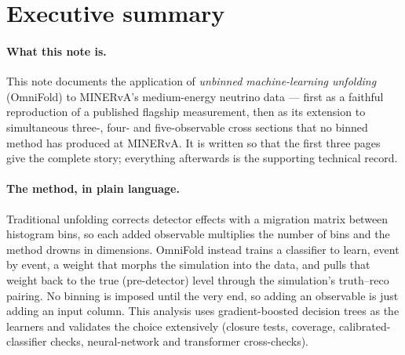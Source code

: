 \section*{Executive summary}
\label{sec:execsummary}

\paragraph{What this note is.}
This note documents the application of \emph{unbinned machine-learning
unfolding} (OmniFold) to MINERvA's medium-energy neutrino data --- first as a
faithful reproduction of a published flagship measurement, then as its
extension to simultaneous three-, four- and five-observable cross sections
that no binned method has produced at MINERvA. It is written so that the
first three pages give the complete story; everything afterwards is the
supporting technical record.

\paragraph{The method, in plain language.}
Traditional unfolding corrects detector effects with a migration matrix
between histogram bins, so each added observable multiplies the number of
bins and the method drowns in dimensions. OmniFold instead trains a
classifier to learn, event by event, a weight that morphs the simulation
into the data, and pulls that weight back to the true (pre-detector) level
through the simulation's truth--reco pairing. No binning is imposed until
the very end, so adding an observable is just adding an input column.
This analysis uses gradient-boosted decision trees as the learners and
validates the choice extensively (closure tests, coverage, calibrated-
classifier checks, neural-network and transformer cross-checks).

